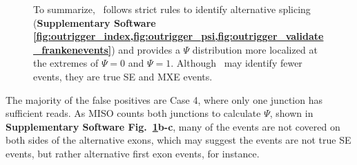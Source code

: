 \begin{figure}
{%
To summarize, \outrigger\, follows strict rules to identify alternative splicing (\textbf{Supplementary Software \ref{fig:outrigger_index,fig:outrigger_psi,fig:outrigger_validate_frankenevents}}) and provides a $\Psi$ distribution more localized at the extremes of $\Psi=0$ and $\Psi=1$. Although \outrigger\, may identify fewer events, they are true SE and MXE events.
}
\label{fig:miso}
\end{figure}


The majority of the false positives are Case 4, where only one junction has sufficient reads. As MISO counts both junctions to calculate $\Psi$, shown in \textbf{Supplementary Software Fig.~\ref{fig:miso}b-c}, many of the events are not covered on both sides of the alternative exons, which may suggest the events are not true SE events, but rather alternative first exon events, for instance. 

